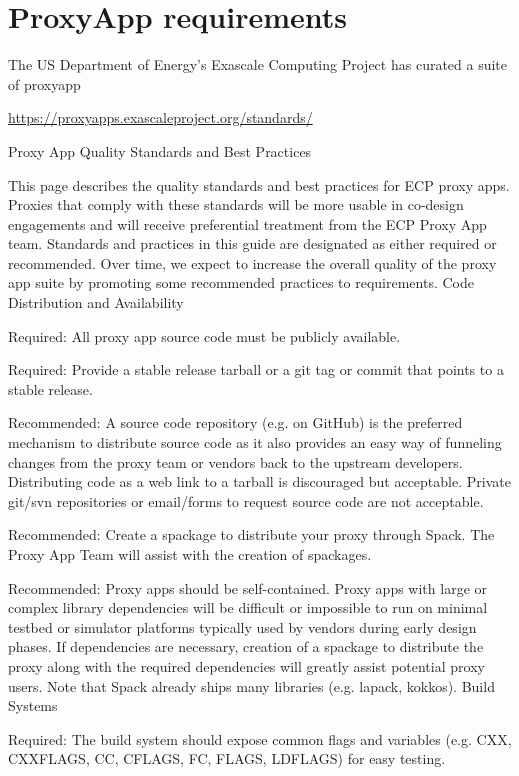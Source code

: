\section{ProxyApp requirements}

The US Department of Energy's Exascale Computing Project \cite{ECP_website} has curated a suite of proxyapp \cite{ECP_proxyapp_website}

\url{https://proxyapps.exascaleproject.org/standards/}

Proxy App Quality Standards and Best Practices

This page describes the quality standards and best practices for ECP proxy apps. Proxies that comply with these standards will be more usable in co-design engagements and will receive preferential treatment from the ECP Proxy App team. Standards and practices in this guide are designated as either required or recommended. Over time, we expect to increase the overall quality of the proxy app suite by promoting some recommended practices to requirements.
Code Distribution and Availability

Required: All proxy app source code must be publicly available.

Required: Provide a stable release tarball or a git tag or commit that points to a stable release.

Recommended: A source code repository (e.g. on GitHub) is the preferred mechanism to distribute source code as it also provides an easy way of funneling changes from the proxy team or vendors back to the upstream developers. Distributing code as a web link to a tarball is discouraged but acceptable. Private git/svn repositories or email/forms to request source code are not acceptable.

Recommended: Create a spackage to distribute your proxy through Spack. The Proxy App Team will assist with the creation of spackages.

Recommended: Proxy apps should be self-contained. Proxy apps with large or complex library dependencies will be difficult or impossible to run on minimal testbed or simulator platforms typically used by vendors during early design phases. If dependencies are necessary, creation of a spackage to distribute the proxy along with the required dependencies will greatly assist potential proxy users. Note that Spack already ships many libraries (e.g. lapack, kokkos).
Build Systems

Required: The build system should expose common flags and variables (e.g. CXX, CXXFLAGS, CC, CFLAGS, FC, FLAGS, LDFLAGS) for easy testing.

